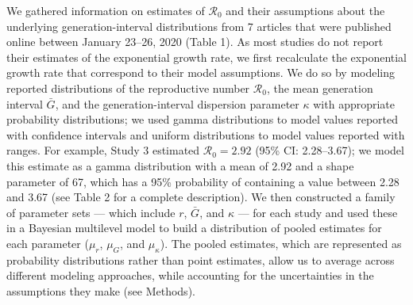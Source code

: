 \documentclass[12pt]{article}
\newcommand{\Ro}{\ensuremath{{\mathcal R}_{0}}\xspace}
\begin{document}
We gathered information on estimates of \Ro and their assumptions about the underlying generation-interval distributions from 7 articles that were published online between January 23--26, 2020 (Table 1).
As most studies do not report their estimates of the exponential growth rate, we first recalculate the exponential growth rate that correspond to their model assumptions.
We do so by modeling reported distributions of the reproductive number \Ro, the mean generation interval $\bar G$, and the generation-interval dispersion parameter $\kappa$ with appropriate probability distributions;
we used gamma distributions to model values reported with confidence intervals and uniform distributions to model values reported with ranges.
For example, Study 3 estimated $\Ro = 2.92$ (95\% CI: 2.28--3.67);
we model this estimate as a gamma distribution with a mean of 2.92 and a shape parameter of 67, which has a 95\% probability of containing a value between 2.28 and 3.67 (see Table 2 for a complete description).
We then constructed a family of parameter sets --- which include $r$, $\bar G$, and $\kappa$ --- for each study and used these in a Bayesian multilevel model to build a distribution of pooled estimates for each parameter ($\mu_r$, $\mu_G$, and $\mu_\kappa$).
The pooled estimates, which are represented as probability distributions rather than point estimates, allow us to average across different modeling approaches, while accounting for the uncertainties in the assumptions they make (see Methods).
\end{document}
